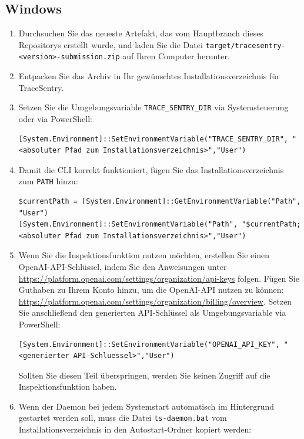\documentclass[a4paper,12pt]{report}
\begin{document}
    \subsection{Windows}
    \begin{enumerate}
        \item Durchsuchen Sie das neueste Artefakt, das vom Hauptbranch dieses Repositorys erstellt wurde, und laden Sie die Datei
        \texttt{target/tracesentry-\textless{}version\textgreater{}-submission.zip} auf Ihren Computer herunter.
        \item Entpacken Sie das Archiv in Ihr gewünschtes Installationsverzeichnis für TraceSentry.
        \item Setzen Sie die Umgebungsvariable \texttt{TRACE\_SENTRY\_DIR} via Systemsteuerung oder via PowerShell:
        \begin{lstlisting}[label={lst:lstlisting-windows-1}]
[System.Environment]::SetEnvironmentVariable("TRACE_SENTRY_DIR", "<absoluter Pfad zum Installationsverzeichnis>","User")
        \end{lstlisting}
        \item Damit die CLI korrekt funktioniert, fügen Sie das Installationsverzeichnis zum \texttt{PATH} hinzu:
        \begin{lstlisting}[label={lst:lstlisting-windows-2}]
$currentPath = [System.Environment]::GetEnvironmentVariable("Path", "User")
[System.Environment]::SetEnvironmentVariable("Path", "$currentPath;<absoluter Pfad zum Installationsverzeichnis>","User")
        \end{lstlisting}
        \item Wenn Sie die Inspektionsfunktion nutzen möchten, erstellen Sie einen OpenAI-API-Schlüssel, indem Sie den Anweisungen unter \url{https://platform.openai.com/settings/organization/api-keys} folgen.
        Fügen Sie Guthaben zu Ihrem Konto hinzu, um die OpenAI-API nutzen zu können: \url{https://platform.openai.com/settings/organization/billing/overview}.
        Setzen Sie anschließend den generierten API-Schlüssel als Umgebungsvariable via PowerShell:
        \begin{lstlisting}[label={lst:lstlisting-windows-3}]
[System.Environment]::SetEnvironmentVariable("OPENAI_API_KEY", "<generierter API-Schluessel>","User")
        \end{lstlisting}
        Sollten Sie diesen Teil überspringen, werden Sie keinen Zugriff auf die Inspektionsfunktion haben.
        \item Wenn der Daemon bei jedem Systemstart automatisch im Hintergrund gestartet werden soll, muss die Datei \texttt{ts-daemon.bat} vom Installationsverzeichnis in den Autostart-Ordner kopiert werden:

\end{enumerate}
\end{document}
